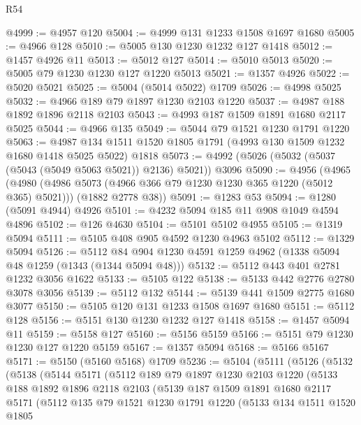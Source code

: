 \begin{lexlean}{R54}
\begin{coremodule}
@4999 := @4957 @120
@5004 := @4999 @131 @1233 @1508 @1697 @1680
@5005 := @4966 @128
@5010 := @5005 @130 @1230 @1232 @127 @1418
@5012 := @1457 @4926 @11
@5013 := @5012 @127
@5014 := @5010 @5013
@5020 := @5005 @79 @1230 @1230 @127 @1220 @5013
@5021 := @1357 @4926
@5022 := @5020 @5021
@5025 := @5004 (@5014 @5022) @1709
@5026 := @4998 @5025
@5032 := @4966 @189 @79 @1897 @1230 @2103 @1220
@5037 := @4987 @188 @1892 @1896 @2118 @2103
@5043 := @4993 @187 @1509 @1891 @1680 @2117 @5025
@5044 := @4966 @135
@5049 := @5044 @79 @1521 @1230 @1791 @1220
@5063 := @4987 @134 @1511 @1520 @1805 @1791 (@4993 @130 @1509 @1232 @1680 @1418 @5025 @5022) @1818
@5073 := @4992 (@5026 (@5032 (@5037 (@5043 (@5049 @5063 @5021)) @2136) @5021)) @3096
@5090 := @4956
    (@4965
      (@4980 (@4986 @5073 (@4966 @366 @79 @1230 @1230 @365 @1220 (@5012 @365) @5021)))
      (@1882 @2778 @38))
@5091 := @1283 @53
@5094 := @1280 (@5091 @4944) @4926
@5101 := @4232 @5094 @185 @11 @908 @1049 @4594 @4896
@5102 := @126 @4630
@5104 := @5101 @5102 @4955
@5105 := @1319 @5094
@5111 := @5105 @408 @905 @4592 @1230 @4963 @5102
@5112 := @1329 @5094
@5126 := @5112 @84 @904 @1230 @4591 @1259 @4962 (@1338 @5094 @48 @1259 (@1343 (@1344 @5094 @48)))
@5132 := @5112 @443 @401 @2781 @1232 @3056 @1622
@5133 := @5105 @122
@5138 := @5133 @442 @2776 @2780 @3078 @3056
@5139 := @5112 @132
@5144 := @5139 @441 @1509 @2775 @1680 @3077
@5150 := @5105 @120 @131 @1233 @1508 @1697 @1680
@5151 := @5112 @128
@5156 := @5151 @130 @1230 @1232 @127 @1418
@5158 := @1457 @5094 @11
@5159 := @5158 @127
@5160 := @5156 @5159
@5166 := @5151 @79 @1230 @1230 @127 @1220 @5159
@5167 := @1357 @5094
@5168 := @5166 @5167
@5171 := @5150 (@5160 @5168) @1709
@5236 := @5104
    (@5111
      (@5126
        (@5132
          (@5138
            (@5144
              @5171
              (@5112
                @189
                @79
                @1897
                @1230
                @2103
                @1220
                (@5133
                  @188
                  @1892
                  @1896
                  @2118
                  @2103
                  (@5139
                    @187
                    @1509
                    @1891
                    @1680
                    @2117
                    @5171
                    (@5112
                      @135
                      @79
                      @1521
                      @1230
                      @1791
                      @1220
                      (@5133
                        @134
                        @1511
                        @1520
                        @1805

\end{coremodule}
\end{lexlean}
